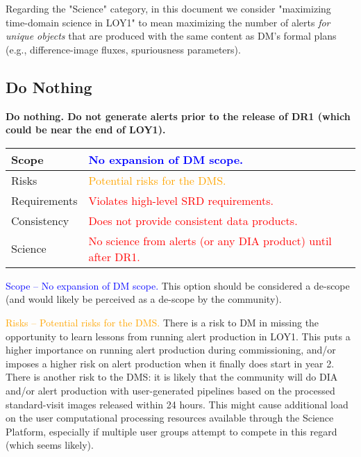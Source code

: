 \documentclass[DM,lsstdraft,toc]{lsstdoc}
\begin{document}
Regarding the "Science" category, in this document we consider "maximizing time-domain science in LOY1" to mean maximizing the number of alerts {\em for unique objects} that are produced with the same content as DM's formal plans (e.g., difference-image fluxes, spuriousness parameters). 

\clearpage
\subsection{Do Nothing}\label{ssec:potsol_donothing}

{\bf Do nothing. Do not generate alerts prior to the release of DR1 (which could be near the end of LOY1).}

\begin{center}
\begin{tabular}{|p{2.5cm}|p{13cm}|}
\hline
Scope & \textcolor{blue}{No expansion of DM scope.} \\
\hline
Risks & \textcolor{orange}{Potential risks for the DMS.} \\
\hline
Requirements & \textcolor{red}{Violates high-level SRD requirements.} \\
\hline
Consistency & \textcolor{red}{Does not provide consistent data products.} \\
\hline
Science & \textcolor{red}{No science from alerts (or any DIA product) until after DR1.} \\
\hline
\end{tabular}
\end{center}

\textcolor{blue}{ Scope -- No expansion of DM scope.} This option should be considered a de-scope (and would likely be perceived as a de-scope by the community).

\textcolor{orange}{ Risks -- Potential risks for the DMS.} There is a risk to DM in missing the opportunity to learn lessons from running alert production in LOY1. This puts a higher importance on running alert production during commissioning, and/or imposes a higher risk on alert production when it finally does start in year 2. There is another risk to the DMS: it is likely that the community will do DIA and/or alert production with user-generated pipelines based on the processed standard-visit images released within 24 hours. This might cause additional load on the user computational processing resources available through the Science Platform, especially if multiple user groups attempt to compete in this regard (which seems likely).
\end{document}
